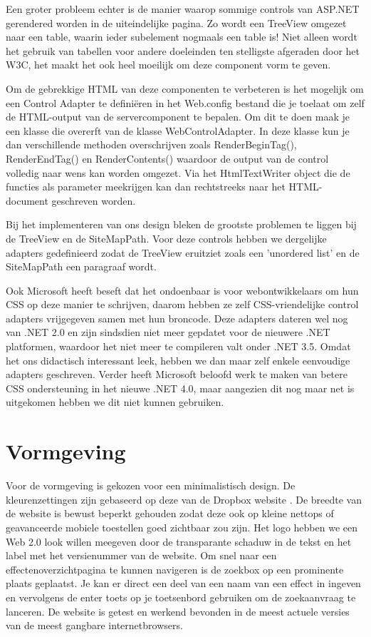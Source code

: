 Een groter probleem echter is de manier waarop sommige controls van ASP.NET gerendered worden in de uiteindelijke pagina. Zo wordt een TreeView omgezet naar een table, waarin ieder subelement nogmaals een table is! Niet alleen wordt het gebruik van tabellen voor andere doeleinden ten stelligste afgeraden door het W3C, het maakt het ook heel moeilijk om deze component vorm te geven.

Om de gebrekkige HTML van deze componenten te verbeteren is het mogelijk om een Control Adapter te defini\"eren in het Web.config bestand die je toelaat om zelf de HTML-output van de servercomponent te bepalen. Om dit te doen maak je een klasse die overerft van de klasse WebControlAdapter. In deze klasse kun je dan verschillende methoden overschrijven zoals RenderBeginTag(), RenderEndTag() en RenderContents() waardoor de output van de control volledig naar wens kan worden omgezet. Via het HtmlTextWriter object die de functies als parameter meekrijgen kan dan rechtstreeks naar het HTML-document geschreven worden.

Bij het implementeren van ons design bleken de grootste problemen te liggen bij de TreeView en de SiteMapPath. Voor deze controls hebben we dergelijke adapters gedefinieerd zodat de TreeView eruitziet zoals een 'unordered list' en de SiteMapPath een paragraaf wordt.

Ook Microsoft heeft beseft dat het ondoenbaar is voor webontwikkelaars om hun CSS op deze manier te schrijven, daarom hebben ze zelf CSS-vriendelijke control adapters vrijgegeven samen met hun broncode. Deze adapters dateren wel nog van .NET 2.0 en zijn sindsdien niet meer gepdatet voor de nieuwere .NET platformen, waardoor het niet meer te compileren valt onder .NET 3.5. Omdat het ons didactisch interessant leek, hebben we dan maar zelf enkele eenvoudige adapters geschreven. Verder heeft Microsoft beloofd werk te maken van betere CSS ondersteuning in het nieuwe .NET 4.0, maar aangezien dit nog maar net is uitgekomen hebben we dit niet kunnen gebruiken.

\section{Vormgeving}

Voor de vormgeving is gekozen voor een minimalistisch design. De kleurenzettingen zijn gebaseerd op deze van de Dropbox website . De breedte van de website is bewust beperkt gehouden zodat deze ook op kleine nettops of geavanceerde mobiele toestellen goed zichtbaar zou zijn.
Het logo hebben we een Web 2.0 look willen meegeven door de transparante schaduw in de tekst en het label met het versienummer van de website.
Om snel naar een effectenoverzichtpagina te kunnen navigeren is de zoekbox op een prominente plaats geplaatst. Je kan er direct een deel van een naam van een effect in ingeven en vervolgens de enter toets op je toetsenbord gebruiken om de zoekaanvraag te lanceren. De website is getest en werkend bevonden in de meest actuele versies van de meest gangbare internetbrowsers.

